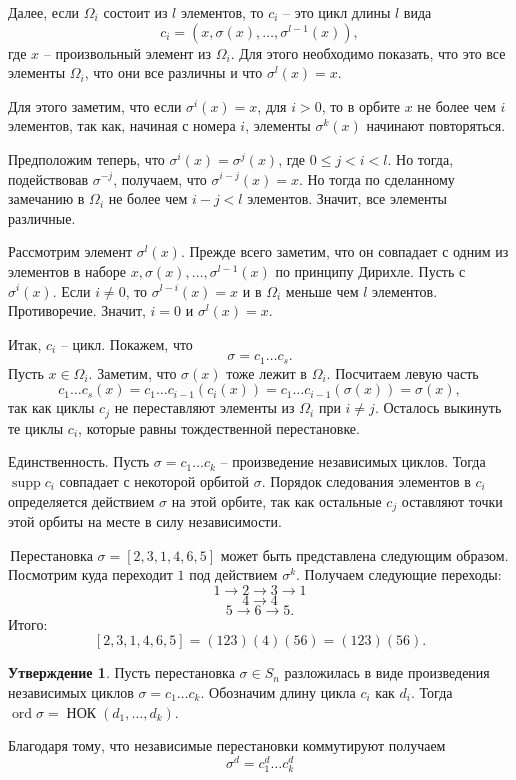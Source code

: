 \documentclass[10pt,a4paper,oneside]{book}
\theoremstyle{definition}
\newtheorem{utvr}{\color{blue!50!black}Утверждение}
\renewcommand{\leq}{\leqslant}
\newcommand{\ord}{\operatorname{ord}}
\newcommand{\supp}{\operatorname{supp}}
\newcommand{\Nok}{\operatorname{\text{НОК}}}
\def\exm{\noindent {\bf Примеры:}}
\def\utv{\begin{utvr}}
\def\eutv{\end{utvr}}
\begin{document}
Далее, если $\Omega_i$ состоит из $l$ элементов, то $c_i$ -- это цикл длины $l$ вида 
$$c_i=(x,\sigma(x),\dots,\sigma^{l-1}(x)), $$ где $x$ -- произвольный элемент из $\Omega_i$. Для этого необходимо показать, что это все элементы $\Omega_i$, что они все различны и что $\sigma^l(x)=x$.

Для этого заметим, что если $\sigma^i(x)=x$, для $i>0$, то в орбите $x$ не более чем $i$ элементов, так как, начиная с номера $i$, элементы $\sigma^k(x)$ начинают повторяться.

Предположим теперь, что $\sigma^i(x)=\sigma^j(x)$, где $0\leq j<i<l$. Но тогда, подействовав  $\sigma^{-j}$, получаем, что $\sigma^{i-j}(x)=x$. Но тогда по сделанному замечанию в $\Omega_i$ не более чем $i-j <l$ элементов. Значит, все элементы различные. 

Рассмотрим элемент $\sigma^l(x)$. Прежде всего заметим, что он совпадает с одним из элементов в наборе $x, \sigma(x),\dots,\sigma^{l-1}(x)$ по принципу Дирихле. Пусть с $\sigma^{i}(x)$. Если $i\neq 0$, то $\sigma^{l-i}(x)=x$ и в $\Omega_i$ меньше чем $l$ элементов. Противоречие. Значит, $i=0$ и $\sigma^l(x)=x$.

Итак, $c_i$ -- цикл. Покажем, что 
$$\sigma=c_1\dots c_s.$$
Пусть $x\in \Omega_i$. Заметим, что $\sigma(x)$ тоже лежит в $\Omega_i$. Посчитаем левую часть
$$c_1\dots c_s(x)=c_1\dots c_{i-1} (c_i(x))=c_1\dots c_{i-1} (\sigma(x))=\sigma(x),$$
так как циклы $c_j$ не переставляют элементы из $\Omega_i$ при $i\neq j$. Осталось выкинуть те циклы $c_i$, которые равны тождественной перестановке.

Единственность. Пусть $\sigma= c_1\dots c_k$ -- произведение независимых циклов. Тогда $\supp c_i$ совпадает с некоторой орбитой $\sigma$. Порядок следования элементов в $c_i$ определяется действием $\sigma$ на этой орбите, так как остальные $c_j$ оставляют точки этой орбиты на месте в силу независимости. 
\endproof



\exm \,Перестановка $\sigma=[2,3,1,4,6,5]$ может быть представлена следующим образом. Посмотрим куда переходит $1$ под действием $\sigma^k$. Получаем следующие переходы:
$$1\to 2\to 3 \to 1$$ 
$$4 \to 4 $$
$$ 5\to 6\to 5.$$
Итого: 
$$[2,3,1,4,6,5]=(123)(4)(56)=(123)(56).$$

\utv Пусть перестановка $\sigma \in S_n$ разложилась в виде произведения  независимых циклов $\sigma=c_1\dots c_k$. Обозначим длину цикла $c_i$  как $d_i$. Тогда $\ord \sigma= \Nok(d_1,\dots,d_k)$.
\eutv
\proof Благодаря тому, что независимые перестановки коммутируют получаем
$$\sigma^d=c_1^d\dots c_k^d$$
\end{document}
